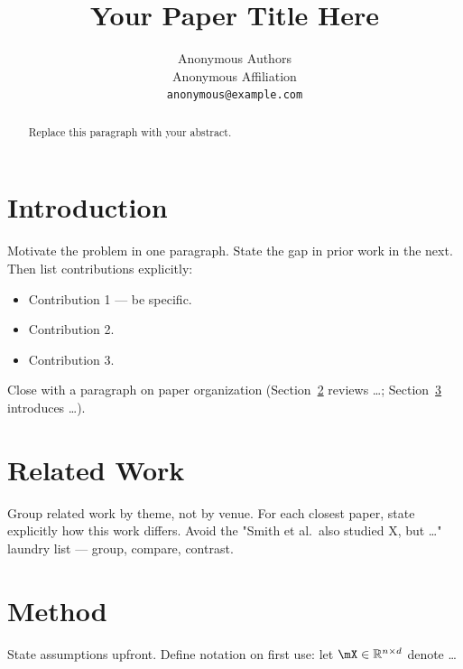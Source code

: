 \documentclass{article}
\title{Your Paper Title Here}
\author{Anonymous Authors \\
Anonymous Affiliation \\
\texttt{anonymous@example.com}
}
\begin{document}
\maketitle

\begin{abstract}
Replace this paragraph with your abstract.
\end{abstract}

\section{Introduction}
\label{sec:intro}

Motivate the problem in one paragraph. State the gap in prior work in the
next. Then list contributions explicitly:

\begin{itemize}
    \item Contribution 1 — be specific.
    \item Contribution 2.
    \item Contribution 3.
\end{itemize}

Close with a paragraph on paper organization (Section~\ref{sec:related}
reviews \dots; Section~\ref{sec:method} introduces \dots).

\section{Related Work}
\label{sec:related}

Group related work by theme, not by venue. For each closest paper, state
explicitly how this work differs. Avoid the "Smith et al.\ also studied X,
but \dots" laundry list — group, compare, contrast.

\section{Method}
\label{sec:method}

State assumptions upfront. Define notation on first use:
let $\mX \in \mathbb{R}^{n \times d}$ denote \dots
\end{document}
